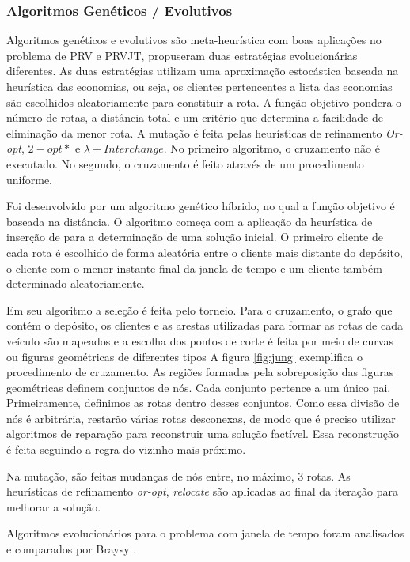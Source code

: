 \subsubsection{Algoritmos Genéticos / Evolutivos}

Algoritmos genéticos e evolutivos são meta-heurística com boas aplicações no problema de PRV e PRVJT, \cite{Homberger}  propuseram duas estratégias evolucionárias diferentes. As duas estratégias utilizam uma aproximação estocástica baseada na heurística das economias, ou seja, os clientes pertencentes a lista das economias são escolhidos aleatoriamente para constituir a rota. A função objetivo pondera o número de rotas, a distância total e um critério que determina a facilidade de eliminação da menor rota. A mutação é feita pelas heurísticas de refinamento \textit{Or-opt}, \({2-opt\ast}\) e \(\lambda-Interchange\). No primeiro algoritmo, o cruzamento não é executado. No segundo, o cruzamento é feito através de um procedimento uniforme.

Foi desenvolvido por \cite{Jung} um algoritmo genético híbrido, no qual a função objetivo é baseada na distância. O algoritmo começa com a aplicação da heurística de inserção de \cite{Solomon} para a determinação de uma solução inicial. O primeiro cliente de cada rota é escolhido de forma aleatória entre o cliente mais distante do depósito, o cliente com o menor instante final da janela de tempo e um cliente também determinado aleatoriamente. 

 Em seu algoritmo a seleção é feita pelo torneio. Para o cruzamento, o grafo que contém o depósito, os clientes e as arestas utilizadas para formar as rotas de cada veículo são mapeados e a escolha dos pontos de corte é feita por meio de curvas ou figuras geométricas de diferentes tipos A figura \ref{fig:jung} exemplifica o procedimento de cruzamento. As regiões formadas pela sobreposição das figuras geométricas definem conjuntos de nós. Cada conjunto pertence a um único pai. Primeiramente, definimos as rotas dentro desses conjuntos. Como essa divisão de nós é arbitrária, restarão várias rotas desconexas, de modo que é preciso utilizar algoritmos de reparação para reconstruir uma solução factível. Essa reconstrução é feita seguindo a regra do vizinho mais próximo.
 
 Na mutação, são feitas mudanças de nós entre, no máximo, 3 rotas. As heurísticas de refinamento \textit{or-opt}, \textit{relocate} são aplicadas ao final da iteração para melhorar a solução.  
 
 Algoritmos evolucionários para o problema com janela de tempo foram analisados e comparados por Braysy \cite{BraysyAG}.
 
